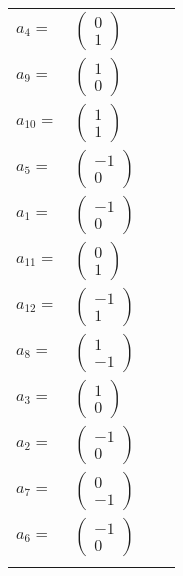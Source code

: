 \documentclass[1p]{elsarticle_modified}
\theoremstyle{definition}
\begin{document}
\begin{tabular}{m{7pt} m{180pt} m{7pt} m{180pt} }
\flushright $a_{4}=$&$\begin{pmatrix}0\\1\end{pmatrix}$ \\
\flushright $a_{9}=$&$\begin{pmatrix}1\\0\end{pmatrix}$ \\
\flushright $a_{10}=$&$\begin{pmatrix}1\\1\end{pmatrix}$ \\
\flushright $a_{5}=$&$\begin{pmatrix}-1\\0\end{pmatrix}$ \\
\flushright $a_{1}=$&$\begin{pmatrix}-1\\0\end{pmatrix}$ \\
\flushright $a_{11}=$&$\begin{pmatrix}0\\1\end{pmatrix}$ \\
\flushright $a_{12}=$&$\begin{pmatrix}-1\\1\end{pmatrix}$ \\
\flushright $a_{8}=$&$\begin{pmatrix}1\\-1\end{pmatrix}$ \\
\flushright $a_{3}=$&$\begin{pmatrix}1\\0\end{pmatrix}$ \\
\flushright $a_{2}=$&$\begin{pmatrix}-1\\0\end{pmatrix}$ \\
\flushright $a_{7}=$&$\begin{pmatrix}0\\-1\end{pmatrix}$ \\
\flushright $a_{6}=$&$\begin{pmatrix}-1\\0\end{pmatrix}$\\&\end{tabular}
\end{document}
